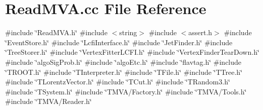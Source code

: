 \section{Read\+M\+V\+A.\+cc File Reference}
\label{ReadMVA_8cc}
{\ttfamily \#include \char`\"{}Read\+M\+V\+A.\+h\char`\"{}}\newline
{\ttfamily \#include $<$string$>$}\newline
{\ttfamily \#include $<$assert.\+h$>$}\newline
{\ttfamily \#include \char`\"{}Event\+Store.\+h\char`\"{}}\newline
{\ttfamily \#include \char`\"{}Lcfi\+Interface.\+h\char`\"{}}\newline
{\ttfamily \#include \char`\"{}Jet\+Finder.\+h\char`\"{}}\newline
{\ttfamily \#include \char`\"{}Tree\+Storer.\+h\char`\"{}}\newline
{\ttfamily \#include \char`\"{}Vertex\+Fitter\+L\+C\+F\+I.\+h\char`\"{}}\newline
{\ttfamily \#include \char`\"{}Vertex\+Finder\+Tear\+Down.\+h\char`\"{}}\newline
{\ttfamily \#include \char`\"{}algo\+Sig\+Prob.\+h\char`\"{}}\newline
{\ttfamily \#include \char`\"{}algo\+Etc.\+h\char`\"{}}\newline
{\ttfamily \#include \char`\"{}flavtag.\+h\char`\"{}}\newline
{\ttfamily \#include \char`\"{}T\+R\+O\+O\+T.\+h\char`\"{}}\newline
{\ttfamily \#include \char`\"{}T\+Interpreter.\+h\char`\"{}}\newline
{\ttfamily \#include \char`\"{}T\+File.\+h\char`\"{}}\newline
{\ttfamily \#include \char`\"{}T\+Tree.\+h\char`\"{}}\newline
{\ttfamily \#include \char`\"{}T\+Lorentz\+Vector.\+h\char`\"{}}\newline
{\ttfamily \#include \char`\"{}T\+Cut.\+h\char`\"{}}\newline
{\ttfamily \#include \char`\"{}T\+Random3.\+h\char`\"{}}\newline
{\ttfamily \#include \char`\"{}T\+System.\+h\char`\"{}}\newline
{\ttfamily \#include \char`\"{}T\+M\+V\+A/\+Factory.\+h\char`\"{}}\newline
{\ttfamily \#include \char`\"{}T\+M\+V\+A/\+Tools.\+h\char`\"{}}\newline
{\ttfamily \#include \char`\"{}T\+M\+V\+A/\+Reader.\+h\char`\"{}}\newline

